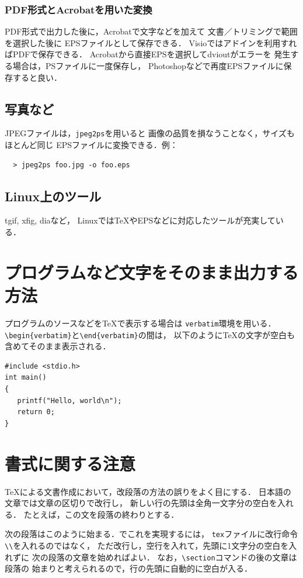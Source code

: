 \documentclass[onecolumn]{jsarticle}
\begin{document}
\subsubsection{PDF形式とAcrobatを用いた変換}
PDF形式で出力した後に，Acrobatで文字などを加えて
文書／トリミングで範囲を選択した後に
EPSファイルとして保存できる．
Visioではアドインを利用すればPDFで保存できる．
Acrobatから直接EPSを選択してdvioutがエラーを
発生する場合は，PSファイルに一度保存し，
Photoshopなどで再度EPSファイルに保存すると良い．

\subsection{写真など}
JPEGファイルは，\texttt{jpeg2ps}を用いると
画像の品質を損なうことなく，サイズもほとんど同じ
EPSファイルに変換できる．例：
\begin{verbatim}
  > jpeg2ps foo.jpg -o foo.eps
\end{verbatim}

\subsection{Linux上のツール}
tgif, xfig, diaなど，
Linuxでは\TeX やEPSなどに対応したツールが充実している．


\section{プログラムなど文字をそのまま出力する方法}
プログラムのソースなどを\TeX で表示する場合は
\verb+verbatim+環境を用いる．
\verb+\begin{verbatim}+と\verb+\end{verbatim}+の間は，
以下のように\TeX の文字が空白も含めてそのまま表示される．
\begin{verbatim}
#include <stdio.h>
int main()
{
   printf("Hello, world\n");
   return 0;
} 
\end{verbatim}


\section{書式に関する注意}
\TeX による文書作成において，改段落の方法の誤りをよく目にする．
日本語の文章では文章の区切りで改行し，
新しい行の先頭は全角一文字分の空白を入れる．
たとえば，この文を段落の終わりとする．

次の段落はこのように始まる．\LaTeXe でこれを実現するには，
\texttt{tex}ファイルに改行命令\verb+\\+を入れるのではなく，
ただ改行し，空行を入れて，先頭に1文字分の空白を入れずに
次の段落の文章を始めればよい．
なお，\verb+\section+コマンドの後の文章は段落の
始まりと考えられるので，行の先頭に自動的に空白が入る．
\end{document}
